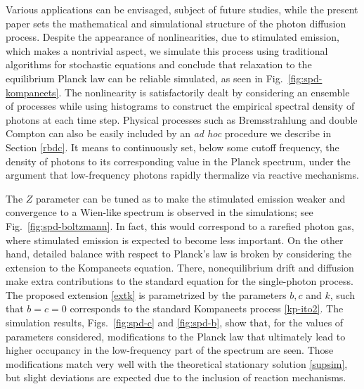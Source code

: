 \documentclass[a4paper,12pt,reqno,superscriptaddress,nofootinbib]{revtex4}
\newcommand{\0}{^{(0)}}
\newcommand{\1}{^{(1)}}
\newcommand{\2}{^{(2)}}
\begin{document}
Various applications can be envisaged, subject of future studies, while the present paper sets the mathematical and simulational structure of the photon diffusion process. Despite the appearance of nonlinearities, due to stimulated emission, which makes a nontrivial aspect, we simulate this process using traditional algorithms for stochastic equations and conclude that relaxation to the equilibrium Planck law can be reliable simulated, as seen in Fig.~\ref{fig:spd-kompaneets}. The nonlinearity  is satisfactorily dealt by considering an ensemble of processes while using histograms to construct the empirical spectral density of photons at each time step. Physical processes such as Bremsstrahlung and double Compton can also be easily included by an \textit{ad hoc} procedure we describe in Section \ref{rbdc}. It means to continuously set, below some cutoff frequency, the density of photons to its corresponding value in the Planck spectrum, under the argument that low-frequency photons rapidly thermalize via reactive mechanisms.

The $Z$ parameter can be tuned as to make the stimulated emission weaker and 
convergence to a Wien-like spectrum is observed in the simulations; see 
Fig.~\ref{fig:spd-boltzmann}. In fact, this would correspond to a rarefied 
photon gas, where stimulated emission is expected to become less important. On 
the other hand, detailed balance with respect to Planck's law is broken by 
considering the extension to the Kompaneets equation. There, nonequilibrium 
drift and diffusion make extra contributions to the standard equation for the 
single-photon process. The proposed extension \eqref{extk} is parametrized by 
the parameters $b,c$ and $k$, such that $b=c=0$ corresponds to the standard 
Kompaneets process \eqref{kp-ito2}. The simulation results, 
Figs.~\ref{fig:spd-c} and \ref{fig:spd-b}, show that, for the values of 
parameters considered, modifications to the Planck law that ultimately lead to 
higher occupancy in the low-frequency part of the spectrum are seen. Those 
modifications match very well with the theoretical stationary solution 
\eqref{supsim}, but slight deviations are expected due to the inclusion of 
reaction mechanisms.
\end{document}
